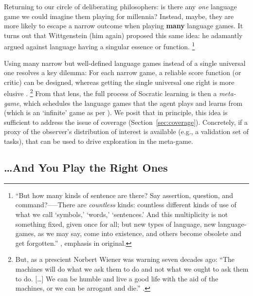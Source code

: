 \documentclass[dvipsnames]{article} %
\begin{document}
Returning to our circle of deliberating philosophers: is there any \emph{one} language game we could imagine them playing for millennia?
Instead, maybe, they are more likely to escape a narrow outcome when playing {\bf many} language games.
It turns out that Wittgenstein (him again) proposed this same idea: he adamantly argued against language having a singular essence or function.%
\footnote{
``But how many kinds of sentence are there? Say assertion,
question, and command?—--There are \emph{countless} kinds: countless different
kinds of use of what we call `symbols,' `words,' `sentences.' And
this multiplicity is not something fixed, given once for all; but new
types of language, new language-games, as we may say, come into
existence, and others become obsolete and get forgotten.'' \citep{wittgenstein-philosophical}, emphasis in original.
}

Using many narrow but well-defined language games instead of a single universal one resolves a key dilemma: For each narrow game, a reliable score function (or critic) can be designed, whereas getting the single universal one right is more elusive \citep[even if possible in principle, as argued by][]{silver2021reward}.%
\footnote{
But, as a prescient Norbert Wiener was warning seven decades ago:
``The machines will do what we ask them to do and not what we ought to ask them to do. [\ldots] We can be humble and live a good life with the aid of the machines, or we can be arrogant and die.'' \citep{wiener}.}
From that lens, the full process of Socratic learning is then a \emph{meta-game}, which schedules the language games that the agent plays and learns from (which is an `infinite' game as per \citet{carse2011finite}).
%
We posit that in principle, this idea is sufficient to address the issue of coverage (Section~\ref{sec:coverage}). Concretely, if a proxy of the observer's distribution of interest is available (e.g., a validation set of tasks), that can be used to drive exploration in the meta-game.


\subsection*{\ldots And You Play the Right Ones}
\end{document}

